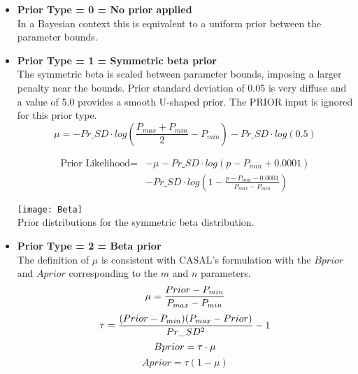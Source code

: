\begin{itemize}
\item  \textbf{Prior Type = 0 = No prior applied} \\ 
In a Bayesian context this is equivalent to a uniform prior between the parameter bounds.

\item  \textbf{Prior Type = 1 = Symmetric beta prior} \\ 
The symmetric beta is scaled between parameter bounds, imposing a larger penalty near the bounds.  Prior standard deviation of 0.05 is very diffuse and a value of 5.0 provides a smooth U-shaped prior. The PRIOR input is ignored for this prior type.
	\begin{equation}  
                \mu = -Pr\_SD \cdot log\left(\frac{P_{max}+P_{min}}{2} - P_{min} \right) - Pr\_SD \cdot log(0.5)
        \end{equation}

	\begin{equation}
		\begin{split}
			\text{Prior Likelihood} = & -\mu - Pr\_SD \cdot log\left(p-P_{min}+0.0001\right) \\
			& - Pr\_SD \cdot log\left(1-\frac{p-P_{min}-0.0001}{P_{max}-P_{min}}\right)
		\end{split}
	\end{equation}

	\begin{center}
			\texttt{[image: Beta]}\\
			Prior distributions for the symmetric beta distribution.
	\end{center}

\item \textbf{Prior Type = 2 = Beta prior}  \\ 
The definition of $\mu$ is consistent with CASAL's formulation with the $Bprior$ and $Aprior$ corresponding to the $m$ and $n$ parameters.
	\begin{equation}
		\mu = \frac{Prior-P_{min}}{P_{max}-P_{min}} \\
        \end{equation}
	\begin{equation}
		\tau  = \frac{(Prior-P_{min})(P_{max}-Prior)}{Pr\_SD^2}-1\\
        \end{equation}
	\begin{equation}
		Bprior  = \tau \cdot \mu\\
        \end{equation}
	\begin{equation}
                Aprior = \tau (1-\mu)
        \end{equation}


\end{itemize}
